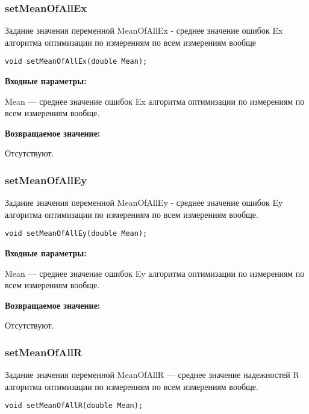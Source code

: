 \documentclass[a4paper,12pt]{article}
\begin{document}
\subsubsection{setMeanOfAllEx}\label{setMeanOfAllEx}

Задание значения переменной MeanOfAllEx - среднее значение ошибок Ex алгоритма оптимизации по измерениям по всем измерениям вообще


\begin{lstlisting}[label=code_syntax_setMeanOfAllEx,caption=Синтаксис]
void setMeanOfAllEx(double Mean);
\end{lstlisting}

\textbf{Входные параметры:}

Mean --- среднее значение ошибок Ex алгоритма оптимизации по измерениям по всем измерениям вообще.

\textbf{Возвращаемое значение:}

Отсутствуют.


\subsubsection{setMeanOfAllEy}\label{setMeanOfAllEy}

Задание значения переменной MeanOfAllEy - среднее значение ошибок Ey алгоритма оптимизации по измерениям по всем измерениям вообще.


\begin{lstlisting}[label=code_syntax_setMeanOfAllEy,caption=Синтаксис]
void setMeanOfAllEy(double Mean);
\end{lstlisting}

\textbf{Входные параметры:}

Mean --- среднее значение ошибок Ey алгоритма оптимизации по измерениям по всем измерениям вообще.

\textbf{Возвращаемое значение:}

Отсутствуют.


\subsubsection{setMeanOfAllR}\label{setMeanOfAllR}

Задание значения переменной MeanOfAllR --- среднее значение надежностей R алгоритма оптимизации по измерениям по всем измерениям вообще.


\begin{lstlisting}[label=code_syntax_setMeanOfAllR,caption=Синтаксис]
void setMeanOfAllR(double Mean);
\end{lstlisting}
\end{document}
